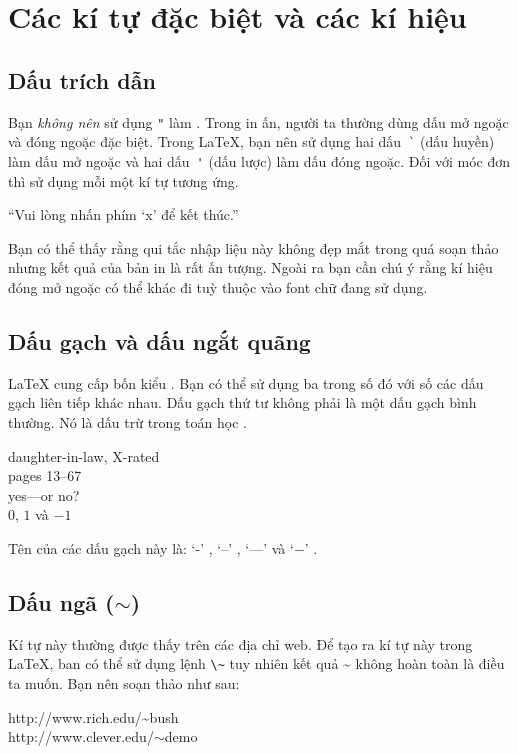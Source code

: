 \section{Các kí tự đặc biệt và các kí hiệu}

\subsection{Dấu trích dẫn}

Bạn \emph{không nên} sử dụng \verb|"| làm  . Trong in ấn, người ta thường dùng dấu mở ngoặc và đóng ngoặc đặc biệt. Trong \LaTeX{}, bạn nên sử dụng hai dấu~\verb|`| (dấu huyền) làm dấu mở ngoặc và hai dấu~\verb|'| (dấu lược) làm dấu đóng ngoặc. Đối với móc đơn thì sử dụng mỗi một kí tự tương ứng.
\begin{example}
``Vui lòng nhấn phím `x'
 để kết thúc.''
\end{example}
Bạn có thể thấy rằng qui tắc nhập liệu này không đẹp mắt trong quá soạn thảo nhưng kết quả của bản in là rất ấn tượng. Ngoài ra bạn cần chú ý rằng kí hiệu đóng mở ngoặc có thể khác đi tuỳ thuộc vào font chữ đang sử dụng.

\subsection{Dấu gạch và dấu ngắt quãng}

\LaTeX{} cung cấp bốn kiểu . Bạn có thể sử dụng ba trong số
đó với số các dấu gạch liên tiếp khác nhau. Dấu gạch thứ tư không
phải là một dấu gạch bình thường. Nó là dấu trừ trong toán học
\index{-} \index{--} \index{---}  .
\begin{example}
daughter-in-law, X-rated\\
pages 13--67\\ yes---or no?
\\ $0$, $1$
và $-1$
\end{example}
Tên của các dấu gạch này là: `-' , `--' ,
`---'  và `$-$' .

\subsection{Dấu ngã (\texorpdfstring{$\sim$}{~})}
 Kí tự này thường được thấy
trên các địa chỉ web. Để tạo ra kí tự này trong \LaTeX{}, ban có
thể sử dụng lệnh \verb|\~| tuy nhiên kết quả \~{} không hoàn toàn
là điều ta muốn. Bạn nên soạn thảo như sau:
\begin{example}
http://www.rich.edu/\~{}bush \\
http://www.clever.edu/$\sim$demo
\end{example}

